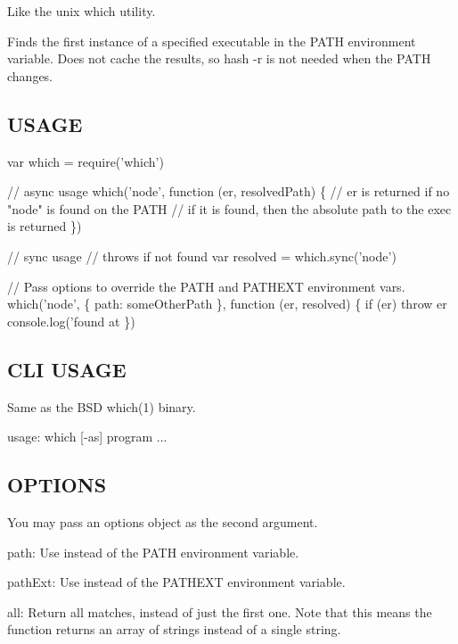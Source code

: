 Like the unix {\ttfamily which} utility.

Finds the first instance of a specified executable in the P\+A\+TH environment variable. Does not cache the results, so {\ttfamily hash -\/r} is not needed when the P\+A\+TH changes.

\subsection*{U\+S\+A\+GE}


\begin{DoxyCode}
var which = require('which')

// async usage
which('node', function (er, resolvedPath) \{
  // er is returned if no "node" is found on the PATH
  // if it is found, then the absolute path to the exec is returned
\})

// sync usage
// throws if not found
var resolved = which.sync('node')

// Pass options to override the PATH and PATHEXT environment vars.
which('node', \{ path: someOtherPath \}, function (er, resolved) \{
  if (er)
    throw er
  console.log('found at %
\})
\end{DoxyCode}


\subsection*{C\+LI U\+S\+A\+GE}

Same as the B\+SD {\ttfamily which(1)} binary.


\begin{DoxyCode}
usage: which [-as] program ...
\end{DoxyCode}


\subsection*{O\+P\+T\+I\+O\+NS}

You may pass an options object as the second argument.


\begin{DoxyItemize}
\item {\ttfamily path}\+: Use instead of the {\ttfamily P\+A\+TH} environment variable.
\item {\ttfamily path\+Ext}\+: Use instead of the {\ttfamily P\+A\+T\+H\+E\+XT} environment variable.
\item {\ttfamily all}\+: Return all matches, instead of just the first one. Note that this means the function returns an array of strings instead of a single string. 
\end{DoxyItemize}